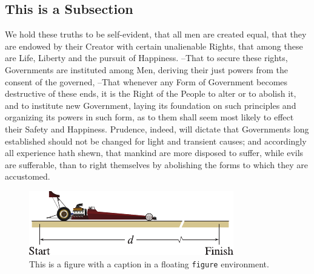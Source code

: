\subsection{This is a Subsection}

We hold these truths to be self-evident, that all men are created equal,  that they are endowed by their Creator with certain unalienable Rights,  that among these are Life, Liberty and the pursuit of Happiness. --That to secure these  rights, Governments are instituted among Men, deriving their just powers  from the consent of the governed, --That whenever any Form of Government  becomes destructive of these ends, it is the Right of the People to alter  or to abolish it, and to institute new Government, laying its foundation on  such principles and organizing its powers in such form, as to them shall  seem most likely to effect their Safety and Happiness. Prudence, indeed, will dictate that Governments long established should not  be changed for light and transient causes; and accordingly all experience  hath shewn, that mankind are more disposed to suffer, while evils are  sufferable, than to right themselves by abolishing the forms to which they  are accustomed.\cite{BhattacharyaJames-1999-A-Theory-of-Thi-0,RimrottJanabi-Sharifi-1992-A-Torque-Free-F-0,DaviesMoon-1993-3-D-Spatial-Cha-0,Tonkin-1980-A-Basic-Attitud-0,Matsumoto-1984-A-Chaotic-Attra-0,MacKay-1988-A-Criterion-for-0,FreundNix-1996-A-Critical-Thic-0,MarsdenHolmes-1979-A-Horseshoe-in--0,Koiller-1984-A-Mechanical-Sy-0,TsiotrasLonguski-1995-A-New-Parameter-0,ShimadaNagashima-1979-A-Numerical-App-0,HsuLee-1971-A-Stability-Stu-0,Muller-PfeifferKranenburg-1992-A-Two-Dimension-0,HashinShtrikman-1963-A-Variational-A-0,Junkins-1997-Adventures-on-t-0}
\begin{figure}%
    \centering
    \includegraphics[scale=1.5]{Chapter-1/Figures/dragster}
    \caption{This is a figure with a caption in a floating \texttt{figure} environment.}
    \label{Ch1-figure: dragster}
\end{figure}


